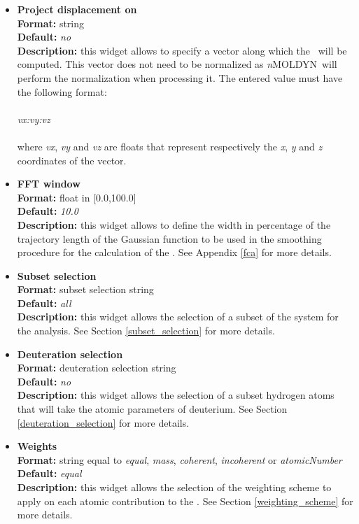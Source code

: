 \documentclass[a4paper,11pt]{report}
\newcommand{\NMOLDYN}{\textit{n}MOLDYN}
\begin{document}
\begin{itemize}
\item \textbf{Project displacement on}\\
\textbf{Format:} string\\
\textbf{Default:} \textit{no}\\
\textbf{Description:} this widget allows to specify a vector along which the \DOS\ will be computed. This vector does not 
need to be normalized as \NMOLDYN\ will perform the normalization when processing it. The entered value must have the 
following format:
\\\\
\textit{vx:vy:vz}
\\\\
where \textit{vx}, \textit{vy} and \textit{vz} are floats that represent respectively the \textit{x}, \textit{y} and \textit{z} coordinates of the vector.

\item \textbf{FFT window}\\
\textbf{Format:} float in [0.0,100.0]\\
\textbf{Default:} \textit{10.0}\\
\textbf{Description:} this widget allows to define the width in percentage of the trajectory length of the Gaussian 
function to be used in the smoothing procedure for the calculation of the \DOS. See Appendix \ref{fca} for more details.

\item \textbf{Subset selection}\\
\textbf{Format:} subset selection string\\
\textbf{Default:} \textit{all}\\
\textbf{Description:} this widget allows the selection of a subset of the system for the analysis. 
See Section \ref{subset_selection} for more details.

\item \textbf{Deuteration selection}\\
\textbf{Format:} deuteration selection string\\
\textbf{Default:} \textit{no}\\
\textbf{Description:} this widget allows the selection of a subset hydrogen atoms that will take the atomic parameters 
of deuterium. See Section \ref{deuteration_selection} for more details.

\item \textbf{Weights}\\
\textbf{Format:} string equal to \textit{equal}, \textit{mass}, \textit{coherent}, \textit{incoherent} or \textit{atomicNumber}\\
\textbf{Default:} \textit{equal}\\
\textbf{Description:} this widget allows the selection of the weighting scheme to apply on each atomic contribution 
to the \DOS. See Section \ref{weighting_scheme} for more details. 


\end{itemize}
\end{document}
